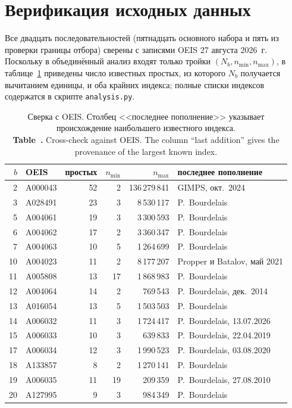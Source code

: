 \documentclass[11pt,a4paper]{article}
\newcommand{\encaptab}[1]{\\[3pt]\foreignlanguage{english}{%
  \textbf{Table~\thetable.} #1}}
\theoremstyle{plain}
\theoremstyle{remark}
\begin{document}
\appendix
\section{Верификация исходных данных}\label{app:data}

Все двадцать последовательностей (пятнадцать основного набора и пять из проверки
границы отбора) сверены с записями OEIS 27 августа 2026~г.
Поскольку в объединённый анализ входят только тройки $(N_b,n_{\min},n_{\max})$,
в таблице~\ref{tab:verify} приведены число известных простых, из которого
$N_b$ получается вычитанием единицы, и оба крайних индекса; полные списки
индексов содержатся в скрипте \texttt{analysis.py}.

\begin{table}[h]
\centering
\caption{Сверка с OEIS. Столбец <<последнее пополнение>> указывает происхождение
наибольшего известного индекса.
\encaptab{Cross-check against OEIS. The column ``last addition'' gives the
provenance of the largest known index.}}
\label{tab:verify}
\small
\begin{tabular}{rlrrrl}
\toprule
$b$ & OEIS & простых & $n_{\min}$ & $n_{\max}$ & последнее пополнение\\
\midrule
2 & A000043 & 52 & 2 & 136\,279\,841 & GIMPS, окт.\ 2024\\
3 & A028491 & 23 & 3 & 8\,530\,117 & P.~Bourdelais\\
5 & A004061 & 19 & 3 & 3\,300\,593 & P.~Bourdelais\\
6 & A004062 & 17 & 2 & 3\,360\,347 & P.~Bourdelais\\
7 & A004063 & 10 & 5 & 1\,264\,699 & P.~Bourdelais\\
10 & A004023 & 11 & 2 & 8\,177\,207 & Propper и Batalov, май 2021\\
11 & A005808 & 13 & 17 & 1\,868\,983 & P.~Bourdelais\\
12 & A004064 & 14 & 2 & 769\,543 & P.~Bourdelais, дек.\ 2014\\
13 & A016054 & 13 & 5 & 1\,503\,503 & P.~Bourdelais\\
14 & A006032 & 11 & 3 & 1\,724\,417 & P.~Bourdelais, 13.07.2026\\
15 & A006033 & 10 & 3 & 639\,833 & P.~Bourdelais, 22.04.2019\\
17 & A006034 & 12 & 3 & 1\,990\,523 & P.~Bourdelais, 03.08.2020\\
18 & A133857 & 8 & 2 & 1\,270\,141 & P.~Bourdelais\\
19 & A006035 & 11 & 19 & 209\,359 & P.~Bourdelais, 27.08.2010\\
20 & A127995 & 9 & 3 & 984\,349 & P.~Bourdelais\\
\bottomrule
\end{tabular}
\end{table}
\end{document}
